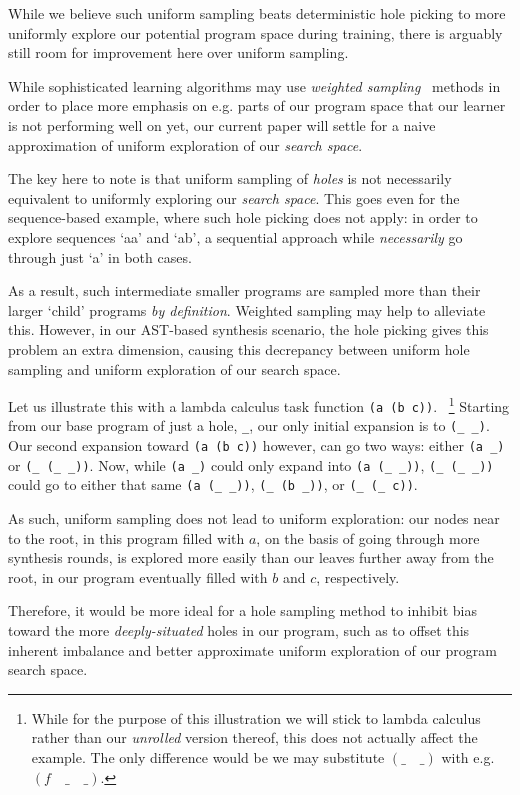 \documentclass{article}
\begin{document}
While we believe such uniform sampling beats deterministic hole picking to more uniformly explore our potential program space during training,
there is arguably still room for improvement here over uniform sampling.

While sophisticated learning algorithms may use \emph{weighted sampling}~\citep{chen1994weighted}
methods in order to place more emphasis on e.g. parts of our program space that our learner is not performing well on yet,
our current paper will settle for a naive approximation of uniform exploration of our \emph{search space}.

The key here to note is that uniform sampling of \emph{holes} is not necessarily equivalent to uniformly exploring our \emph{search space}.
This goes even for the sequence-based example, where such hole picking does not apply:
in order to explore sequences `aa' and `ab',
a sequential approach while \emph{necessarily} go through just `a' in both cases.

As a result, such intermediate smaller programs are sampled more than their larger `child' programs \emph{by definition}.
Weighted sampling may help to alleviate this.
However, in our AST-based synthesis scenario,
the hole picking gives this problem an extra dimension,
causing this decrepancy between uniform hole sampling and uniform exploration of our search space.

Let us illustrate this with a lambda calculus task function \verb|(a (b c))|.%
~\footnote{
    While for the purpose of this illustration we will stick to lambda calculus
    rather than our \emph{unrolled} version thereof,
    this does not actually affect the example.
    The only difference would be we may substitute $(\_\quad\_)$ with e.g. $(f\quad\_\quad\_)$.
}
Starting from our base program of just a hole, \verb|_|,
our only initial expansion is to \verb|(_ _)|.
Our second expansion toward \verb|(a (b c))| however,
can go two ways: either \verb|(a _)| or \verb|(_ (_ _))|.
Now, while \verb|(a _)| could only expand into \verb|(a (_ _))|,
\verb|(_ (_ _))| could go to either that same \verb|(a (_ _))|,
\verb|(_ (b _))|, or \verb|(_ (_ c))|.

As such, uniform sampling does not lead to uniform exploration:
our nodes near to the root, in this program filled with $a$,
on the basis of going through more synthesis rounds,
is explored more easily than our leaves further away from the root,
in our program eventually filled with $b$ and $c$, respectively.

Therefore, it would be more ideal for a hole sampling method to inhibit
bias toward the more \emph{deeply-situated} holes in our program,
such as to offset this inherent imbalance and better approximate
uniform exploration of our program search space.
\end{document}
